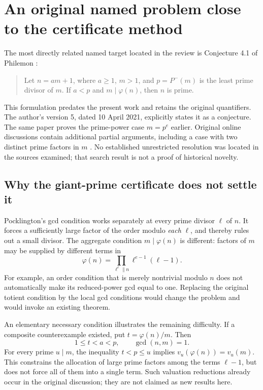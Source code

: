 \documentclass[11pt,a4paper]{article}
\theoremstyle{definition}\newtheorem{definition}[theorem]{Definition}
\theoremstyle{remark}\newtheorem{remark}[theorem]{Remark}
\newcommand{\lpf}{P^{-}}
\newcommand{\ph}{\varphi}
\begin{document}
\section{An original named problem close to the certificate method}
\label{sec:philemon}
The most directly related named target located in the review is
Conjecture 4.1 of Philemon \cite{philemon2021}:
\begin{quote}
Let $n=am+1$, where $a\geq1$, $m>1$, and $p=\lpf(m)$ is the least prime
divisor of $m$. If $a<p$ and $m\mid\ph(n)$, then $n$ is prime.
\end{quote}
This formulation predates the present work and retains the original
quantifiers. The author's version 5, dated 10 April 2021, explicitly
states it as a conjecture. The same paper proves the prime-power case
$m=p^e$ earlier. Original online discussions contain additional partial
arguments, including a case with two distinct prime factors in $m$
\cite{philemonMO,philemonMSE}. No established unrestricted resolution was
located in the sources examined; that search result is not a proof of
historical novelty.

\subsection{Why the giant-prime certificate does not settle it}
Pocklington's gcd condition works separately at every prime divisor
$\ell$ of $n$. It forces a sufficiently large factor of the order modulo
\emph{each} $\ell$, and thereby rules out a small divisor.
The aggregate condition $m\mid\ph(n)$ is different: factors of $m$ may
be supplied by different terms in
\[
 \ph(n)=\prod_{\ell^e\parallel n}\ell^{e-1}(\ell-1).
\]
For example, an order condition that is merely nontrivial modulo $n$
does not automatically make its reduced-power gcd equal to one.
Replacing the original totient condition by the local gcd conditions
would change the problem and would invoke an existing theorem.

An elementary necessary condition illustrates the remaining difficulty.
If a composite counterexample existed, put $t=\ph(n)/m$. Then
\[
 1\leq t<a<p,\qquad\gcd(n,m)=1.
\]
For every prime $u\mid m$, the inequality $t<p\leq u$ implies
$v_u(\ph(n))=v_u(m)$. This constrains the allocation of large prime
factors among the terms $\ell-1$, but does not force all of them into a
single term. Such valuation reductions already occur in the original
discussion; they are not claimed as new results here.

\end{document}

